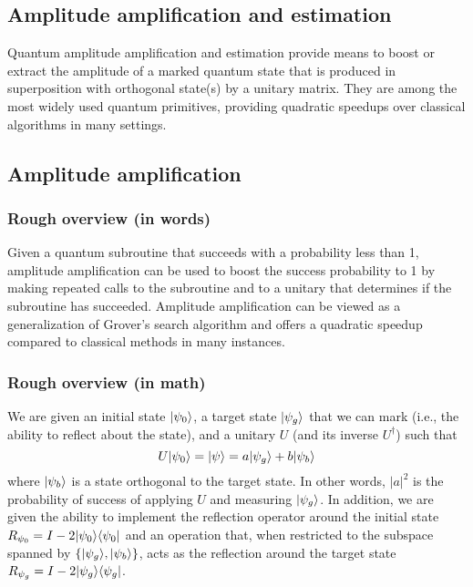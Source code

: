 
\begin{refsection}

\section{Amplitude amplification and estimation}\label{prim:AA}
Quantum amplitude amplification and estimation provide means to boost or extract the amplitude of a marked quantum state that is produced in superposition with orthogonal state(s) by a unitary matrix. They are among the most widely used quantum primitives, providing quadratic speedups over classical algorithms in many settings.


\localtableofcontents

\newpage


\subsection{Amplitude amplification}\label{prim:AmpAmp}


\subsubsection*{Rough overview (in words)}
Given a quantum subroutine that succeeds with a probability less than 1, amplitude amplification can be used to boost the success probability to 1 by making repeated calls to the subroutine and to a unitary that determines if the subroutine has succeeded. Amplitude amplification can be viewed as a generalization of Grover's search algorithm \cite{grover1996QSearch} and offers a quadratic speedup compared to classical methods in many instances.


\subsubsection*{Rough overview (in math)}
We are given an initial state $\lvert\psi_0\rangle$, a target state $\lvert\psi_g\rangle$ that we can mark (i.e., the ability to reflect about the state), and a unitary $U$ (and its inverse $U^\dag$) such that
\begin{equation}
    U\lvert\psi_0\rangle = \lvert\psi\rangle = a \lvert\psi_g\rangle + b\lvert\psi_b\rangle\label{eq:U=a+b}
\end{equation}
where $\lvert\psi_b\rangle$ is a state orthogonal to the target state. In other words, $|a|^2$ is the probability of success of applying $U$ and measuring $\lvert\psi_g\rangle$. In addition, we are given the ability to implement the reflection operator around the initial state $R_{\psi_0} = I - 2\lvert\psi_0\rangle\langle\psi_0\rvert$ and an operation that, when restricted to the subspace spanned by $\{ \lvert\psi_g\rangle, \lvert\psi_b\rangle \}$, acts as the reflection around the target state $R_{\psi_g} = I - 2\lvert\psi_g\rangle\langle\psi_g\rvert$. 


\end{refsection}
